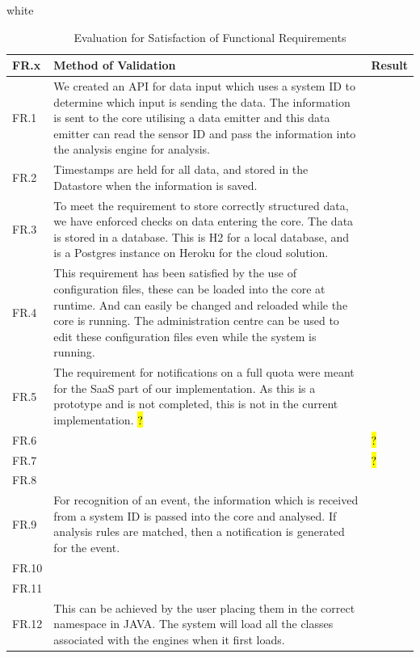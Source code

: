 \documentclass[10pt,a4paper]{article}
\newcommand{\xtableformat}[4]{
\begin{table}[ht!]
\centering
  \rowcolors{2}{gray!10} {white}
\begin{tabularx}{\textwidth}{#1}
  \hline
  \rowcolor[gray]{0.9} #2
  \hline
\end{tabularx}
\caption{#3}
\label{#4}
\end{table}}
\begin{document}
\xtableformat{ p{1.3cm}  X X }{ 
	FR.x  &  	Method of Validation & Result \\ \hline
	FR.1  & 	We created an API for data input which uses a system ID to determine which input is sending the data. The information is sent to the core utilising a data emitter and this data emitter can read the sensor ID and pass the information into the analysis engine for analysis. & \\
	FR.2  & Timestamps are held for all data, and stored in the Datastore when the information is saved. 	  & 	\\
	FR.3  & To meet the requirement to store correctly structured data, we have enforced checks on data entering the core. The data is stored in a database. This is H2 for a local database, and is a Postgres instance on Heroku for the cloud solution. 	  & 	 \\ 
	FR.4  &This requirement has been satisfied by the use of configuration files, these can be loaded into the core at runtime. And can easily be changed and reloaded while the core is running. The administration centre can be used to edit these configuration files even while the system is running.	  & 	 \\ 
	FR.5  & The requirement for notifications on a full quota were meant for the SaaS part of our implementation. As this is a prototype and is not completed, this is not in the current implementation. \hl{?} 	  & 	 \\
	FR.6  & 	  & 	  \hl{?} \\ 
	FR.7  & 	  & 	  \hl{?} \\ 
	FR.8  & 	  & 	 \\ 
	FR.9  & For recognition of an event, the information which is received from a system ID is passed into the core and analysed. If analysis rules are matched, then a notification is generated for the event. 	  & 	\\
	FR.10  & 	  & 	 \\ 
	FR.11  & 	  & 	 \\ 
	FR.12  &This can be achieved by the user placing them in the correct namespace in JAVA. The system will load all the classes associated with the engines when it first loads. 	  & 	 \\ 
}{Evaluation for Satisfaction of Functional Requirements}{frevaltable}
\end{document}
